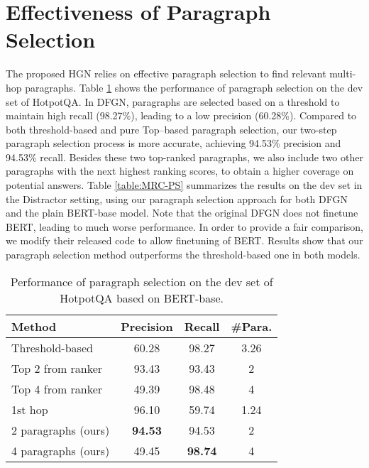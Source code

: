 \documentclass[11pt,a4paper]{article}
\begin{document}
\section{Effectiveness of Paragraph Selection} \label{appendix:para_sel}




The proposed HGN relies on effective paragraph selection to find relevant multi-hop paragraphs. 
Table \ref{table:PS} shows the performance of paragraph selection on the dev set of HotpotQA.
In DFGN, paragraphs are selected based on a threshold to maintain high recall (98.27\%), leading to a low precision (60.28\%). Compared to both threshold-based and pure Top--based paragraph selection, our two-step paragraph selection process is more accurate, achieving 94.53\% precision and 94.53\% recall. Besides these two top-ranked paragraphs, we also include two other paragraphs with the next highest ranking scores, to obtain a higher coverage on potential answers. 
Table \ref{table:MRC-PS} summarizes the results on the dev set in the Distractor setting, using our paragraph selection approach for both DFGN and the plain BERT-base model. Note that the original DFGN does not finetune BERT, leading to much worse performance. In order to provide a fair comparison, we modify their released code to allow finetuning of BERT. 
Results show that our paragraph selection method outperforms the threshold-based one in both models. 

\begin{table}[t!]
\centering
\begin{adjustbox}{scale=0.95,center}
\begin{tabular}{lccc}
\hline
Method & Precision & Recall & \#Para.\\ \hline
Threshold-based & 60.28 & 98.27 & 3.26 \\
Top 2 from ranker & 93.43 & 93.43 & 2 \\ 
Top 4 from ranker & 49.39 & 98.48 & 4 \\\hline
1st hop & 96.10 & 59.74 & 1.24 \\
2 paragraphs (ours) & \textbf{94.53} & 94.53 & 2 \\
4 paragraphs (ours) & 49.45 & \textbf{98.74} & 4 \\ \hline
\end{tabular}
\end{adjustbox}
\caption{\label{table:PS}Performance of paragraph selection on the dev set of HotpotQA based on BERT-base.}
\end{table}
\end{document}
